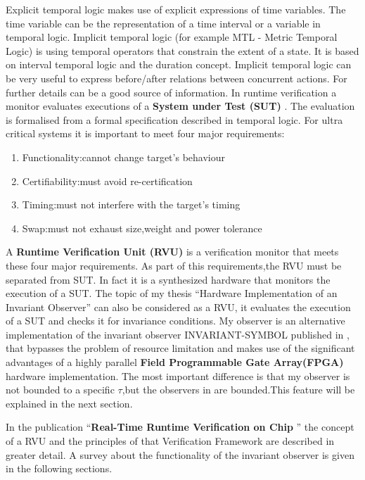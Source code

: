 Explicit temporal logic makes use of explicit expressions of time variables. The time variable can be the representation of a time interval or a variable in temporal logic. 
Implicit temporal logic (for example MTL - Metric Temporal Logic) is using temporal operators that constrain the extent of a state.
It is based on interval temporal logic and the duration concept.
Implicit temporal logic can be very useful to express before/after relations between concurrent actions.
For further details \cite{210306} can be a good source of information.
In runtime verification a monitor evaluates executions of a \textbf{System under Test (SUT)} \cite{RTFMBJ13}. 
The evaluation is formalised from a formal specification described in temporal logic.\newpage
For ultra critical systems it is important to meet four major requirements:
\begin{enumerate}
 \item Functionality:cannot change target's behaviour
 \item Certifiability:must avoid re-certification
 \item Timing:must not interfere with the target's timing
 \item Swap:must not exhaust size,weight and power tolerance
\end{enumerate}

A \textbf{Runtime Verification Unit (RVU)} is a verification monitor that meets these four major requirements.
As part of this requirements,the RVU must be separated from SUT.
In fact it is a synthesized hardware that monitors the execution of a SUT.\newline
The topic of my thesis ``Hardware Implementation of an Invariant Observer'' can also be considered as a RVU,
it evaluates the execution of a SUT and checks it for invariance conditions.
My observer is an alternative implementation of the invariant observer INVARIANT-SYMBOL published in \cite{RTFMBJ13},
that bypasses the problem of resource limitation and makes use of the significant advantages of a highly parallel
\textbf{Field Programmable Gate Array(FPGA)} hardware implementation.
The most important difference is that my observer is not bounded to a specific $\tau$,but the observers in \cite{RTFMBJ13}
are bounded.This feature will be explained in the next section.

In the publication ``\textbf{Real-Time Runtime Verification on Chip} '' \cite{RTFMBJ13} the concept of a RVU and 
the principles of that Verification Framework are described in greater detail.\newline\newline
A survey about the functionality of the invariant observer is given in the following sections.





